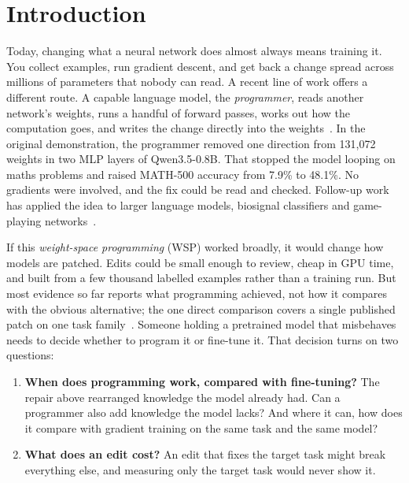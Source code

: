 \section{Introduction}

Today, changing what a neural network does almost always means training it. You collect examples, run gradient descent, and get back a change spread across millions of parameters that nobody can read. A recent line of work offers a different route. A capable language model, the \emph{programmer}, reads another network's weights, runs a handful of forward passes, works out how the computation goes, and writes the change directly into the weights~\citep{takehi2026sparks}. In the original demonstration, the programmer removed one direction from 131,072 weights in two MLP layers of Qwen3.5-0.8B. That stopped the model looping on maths problems and raised MATH-500 accuracy from 7.9\% to 48.1\%. No gradients were involved, and the fix could be read and checked. Follow-up work has applied the idea to larger language models, biosignal classifiers and game-playing networks~\citep{hu2026exploring,varam2026mixed,lehmann2026compiling}.

If this \emph{weight-space programming} (WSP) worked broadly, it would change how models are patched. Edits could be small enough to review, cheap in GPU time, and built from a few thousand labelled examples rather than a training run. But most evidence so far reports what programming achieved, not how it compares with the obvious alternative; the one direct comparison covers a single published patch on one task family~\citep{yang2026writing}. Someone holding a pretrained model that misbehaves needs to decide whether to program it or fine-tune it. That decision turns on two questions:
\begin{enumerate}
  \item \textbf{When does programming work, compared with fine-tuning?} The repair above rearranged knowledge the model already had. Can a programmer also add knowledge the model lacks? And where it can, how does it compare with gradient training on the same task and the same model?
  \item \textbf{What does an edit cost?} An edit that fixes the target task might break everything else, and measuring only the target task would never show it.
\end{enumerate}


